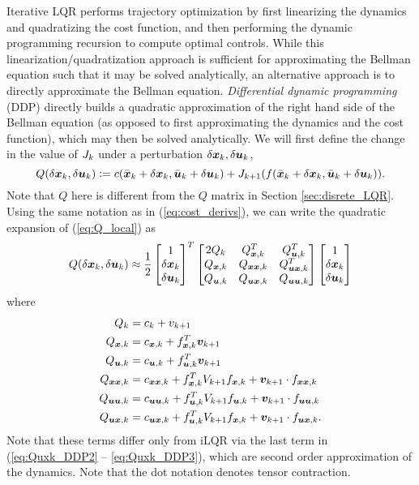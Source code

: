 Iterative LQR performs trajectory optimization by first linearizing the dynamics and quadratizing the cost function, and then performing the dynamic programming recursion to compute optimal controls. While this linearization/quadratization approach is sufficient for approximating the Bellman equation such that it may be solved analytically, an alternative approach is to directly approximate the Bellman equation. \textit{Differential dynamic programming} (DDP) directly builds a quadratic approximation of the right hand side of the Bellman equation (as opposed to first approximating the dynamics and the cost function), which may then be solved analytically. 
We will first define the change in the value of $J_k$ under a perturbation $\delta \bm{x}_k, \delta \bm{u}_k$,
\begin{equation}
    \label{eq:Q_local}
    Q(\delta \bm{x}_k, \delta \bm{u}_k) \vcentcolon= c (\bar{\bm{x}}_k + \delta \bm{x}_k, \bar{\bm{u}}_k + \delta \bm{u}_k) + J_{k+1}(f(\bar{\bm{x}}_k + \delta \bm{x}_k, \bar{\bm{u}}_k + \delta \bm{u}_k)).
\end{equation}
Note that $Q$ here is different from the $Q$ matrix in Section \ref{sec:disrete_LQR}. Using the same notation as in (\ref{eq:cost_derivs}), we can write the quadratic expansion of (\ref{eq:Q_local}) as
\begin{equation}
    Q(\delta \bm{x}_k, \delta \bm{u}_k) \approx 
\frac{1}{2}
    \begin{bmatrix}
    1\\
    \delta \bm{x}_k\\
    \delta \bm{u}_k
\end{bmatrix}^T
    \begin{bmatrix}
    2 Q_k & Q_{\bm{x},k}^T & Q_{\bm{u},k}^T\\
    Q_{\bm{x},k} & Q_{\bm{x} \bm{x},k} & Q_{\bm{u} \bm{x},k}^T\\
    Q_{\bm{u},k} & Q_{\bm{u} \bm{x},k} & Q_{\bm{u} \bm{u},k}
\end{bmatrix}
    \begin{bmatrix}
    1\\
    \delta \bm{x}_k\\
    \delta \bm{u}_k
\end{bmatrix}
\end{equation}
where
\begin{align}
    \label{eq:Quxk_DDP1}
    Q_k &= c_k + v_{k+1}\\
    Q_{\bm{x},k} &= c_{\bm{x},k} + f_{\bm{x},k}^T \bm{v}_{k+1}\\
    Q_{\bm{u},k} &= c_{\bm{u},k} + f_{\bm{u},k}^T \bm{v}_{k+1}\\
    Q_{\bm{x} \bm{x},k} &= c_{\bm{x} \bm{x},k} + f_{\bm{x},k}^T V_{k+1} f_{\bm{x},k} + \bm{v}_{k+1} \cdot f_{\bm{x}\bm{x},k} \label{eq:Quxk_DDP2}\\
    Q_{\bm{u} \bm{u},k} &= c_{\bm{u} \bm{u},k} + f_{\bm{u},k}^T V_{k+1} f_{\bm{u},k} + \bm{v}_{k+1} \cdot f_{\bm{u}\bm{u},k}\\
    Q_{\bm{u} \bm{x},k} &= c_{\bm{u} \bm{x},k} + f_{\bm{u},k}^T V_{k+1} f_{\bm{x},k} + \bm{v}_{k+1} \cdot f_{\bm{u}\bm{x},k}. \label{eq:Quxk_DDP3}
\end{align}
Note that these terms differ only from iLQR via the last term in (\ref{eq:Quxk_DDP2} -- \ref{eq:Quxk_DDP3}), which are second order approximation of the dynamics. Note that the dot notation denotes tensor contraction.

